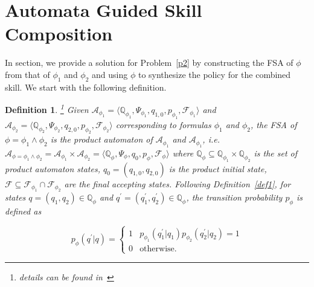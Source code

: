 \documentclass{article}
\newtheorem{definition}{Definition}
\begin{document}

\section{Automata Guided Skill Composition}
\label{spec_amend}

In section, we provide a solution for Problem~\ref{p2} by constructing the FSA of $\phi$ from that of $\phi_1$ and $\phi_2$ and using $\phi$ to synthesize the policy for the combined skill. We start with the following definition. 

\begin{definition}\label{def4}\footnote{details can be found in~\cite{product}}
Given $\mathcal{A}_{\phi_1}=\langle \mathbb{Q}_{\phi_1}, \Psi_{\phi_1}, q_{1,0}, p_{\phi_1}, \mathcal{F}_{\phi_1} \rangle$ and  $\mathcal{A}_{\phi_2}=\langle \mathbb{Q}_{\phi_2}, \Psi_{\phi_2}, q_{2,0}, p_{\phi_2}, \mathcal{F}_{\phi_2} \rangle$ corresponding to formulas $\phi_1$ and $\phi_2$,  the FSA of $\phi=\phi_1 \wedge \phi_2$ is the \textit{product automaton} of $\mathcal{A}_{\phi_1}$ and $\mathcal{A}_{\phi_1}$, i.e.  $\mathcal{A}_{\phi=\phi_1 \wedge \phi_2} = \mathcal{A}_{\phi_1} \times \mathcal{A}_{\phi_2} =  \langle \mathbb{Q}_\phi, \Psi_\phi, q_0, p_\phi, \mathcal{F}_\phi \rangle$ where $\mathbb{Q}_{\phi} \subseteq \mathbb{Q}_{\phi_1} \times \mathbb{Q}_{\phi_2}$ is the set of product automaton states, $q_0 = (q_{1,0}, q_{2,0})$ is the product initial state, $\mathcal{F} \subseteq \mathcal{F}_{\phi_1} \cap \mathcal{F}_{\phi_2}$ are the final accepting states. Following Definition~\ref{def1}, for states $q=(q_1, q_2) \in \mathbb{Q}_\phi$ and $q^\prime = (q_1^\prime, q_2^\prime) \in \mathbb{Q}_\phi$, the transition probability $p_\phi$ is defined as 

\begin{equation}\label{eqF1}
p_\phi(q^\prime| q) = \begin{cases}
1 & p_{\phi_1}(q_1^\prime|q_1)p_{\phi_2}(q_2^\prime|q_2)=1 \\
 0 & \text{otherwise}.
 \end{cases}
\end{equation}

\end{definition}
\end{document}
